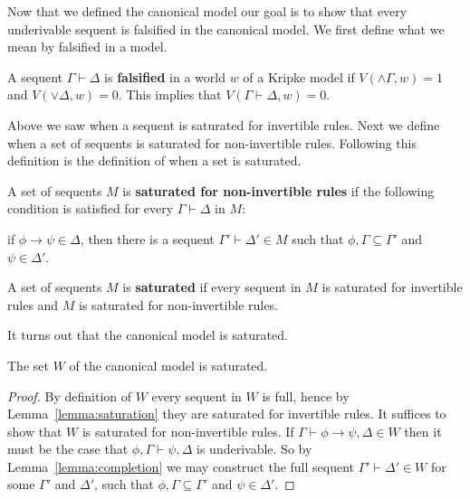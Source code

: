 \documentclass{article}
\begin{document}
Now that we defined the canonical model our goal is to show that every underivable sequent is falsified
in the canonical model. We first define what we mean by falsified in a model.
\begin{definition}
  \label{def:Falsification}
  A sequent $\Gamma \vdash \Delta$ is \textbf{falsified} in a world $w$ of a Kripke model if
  $V(\land \Gamma,w) = 1$ and $V(\lor \Delta, w) = 0$.  This implies that $V(\Gamma \vdash \Delta, w) = 0$.
\end{definition}

Above we saw when a sequent is saturated for invertible rules.  Next we define when a set of sequents 
is saturated for non-invertible rules. Following this definition is the definition of when a set is
saturated.
\begin{definition}
  \label{def:sat_non-invert_rules}
  A set of sequents $M$ is \textbf{saturated for non-invertible rules} if the
  following condition is satisfied for every $\Gamma \vdash \Delta$
  in $M$:
  \begin{center}
    if $\phi \to \psi \in \Delta$, then there is a sequent $\Gamma' \vdash \Delta' \in M$ such that
    $\phi,\Gamma \subseteq \Gamma'$ and $\psi \in \Delta'$.
  \end{center}
\end{definition}

\begin{definition}
  \label{def:sat_set}
  A set of sequents $M$ is \textbf{saturated} if every sequent in $M$ is saturated for invertible rules
  and $M$ is saturated for non-invertible rules.
\end{definition}

\noindent
It turns out that the canonical model is saturated.  

\begin{lemma}
  \label{lemma:canonical_model_is_saturated}
  The set $W$ of the canonical model is saturated.
\end{lemma}
\begin{proof}
  By definition of $W$ every sequent in $W$ is full, hence by Lemma~\ref{lemma:saturation} they are 
  saturated for invertible rules.  It suffices to show that $W$ is saturated for non-invertible rules.
  If $\Gamma \vdash \phi \to \psi,\Delta \in W$ then it must be the case that $\phi,\Gamma \vdash \psi,\Delta$
  is underivable.  So by Lemma~\ref{lemma:completion} we may construct the full sequent 
  $\Gamma' \vdash \Delta' \in W$  for some $\Gamma'$ and $\Delta'$, such that $\phi,\Gamma \subseteq \Gamma'$ and 
  $\psi \in \Delta'$.
\end{proof}
\end{document}
